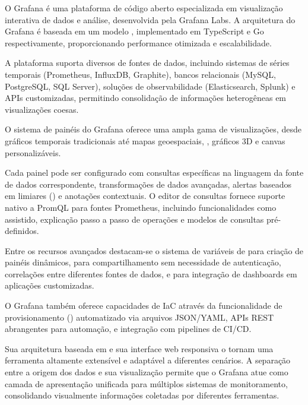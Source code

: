 {\color{red}

O Grafana \citep{grafana2025} é uma plataforma de código aberto especializada em visualização interativa de dados e análise, desenvolvida pela Grafana Labs. A arquitetura do Grafana é baseada em um modelo , implementado em TypeScript e Go respectivamente, proporcionando performance otimizada e escalabilidade.

A plataforma suporta diversos  de fontes de dados, incluindo sistemas de séries temporais (Prometheus, InfluxDB, Graphite), bancos relacionais (MySQL, PostgreSQL, SQL Server), soluções de observabilidade (Elasticsearch, Splunk) e APIs customizadas, permitindo consolidação de informações heterogêneas em visualizações coesas.

O sistema de painéis do Grafana oferece uma ampla gama de visualizações, desde gráficos temporais tradicionais até mapas geoespaciais, , gráficos 3D e canvas personalizáveis.

Cada painel pode ser configurado com consultas específicas na linguagem da fonte de dados correspondente, transformações de dados avançadas, alertas baseados em limiares () e anotações contextuais. O editor de consultas fornece suporte nativo a PromQL para fontes Prometheus, incluindo funcionalidades como  assistido, explicação passo a passo de operações e modelos de consultas pré-definidos.

Entre os recursos avançados destacam-se o sistema de variáveis de  para criação de painéis dinâmicos,  para compartilhamento sem necessidade de autenticação, correlações entre diferentes fontes de dados, e  para integração de dashboards em aplicações customizadas.

O Grafana também oferece capacidades de IaC através da funcionalidade de provisionamento () automatizado via arquivos JSON/YAML, APIs REST abrangentes para automação, e integração com pipelines de CI/CD.

Sua arquitetura baseada em  e sua interface web responsiva o tornam uma ferramenta altamente extensível e adaptável a diferentes cenários. A separação entre a origem dos dados e sua visualização permite que o Grafana atue como camada de apresentação unificada para múltiplos sistemas de monitoramento, consolidando visualmente informações coletadas por diferentes ferramentas.

}

